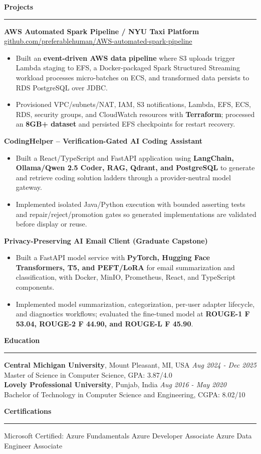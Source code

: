 \documentclass[11pt,letterpaper]{article}
\newcommand{\ressection}[1]{\Needspace{6\baselineskip}\vspace{8pt}\par\textbf{#1}\par\vspace{2pt}\hrule\vspace{5pt}}
\begin{document}
\ressection{Projects}
\textbf{AWS Automated Spark Pipeline / NYU Taxi Platform} \hfill \href{https://github.com/preferablehuman/AWS-automated-spark-pipeline}{github.com/preferablehuman/AWS-automated-spark-pipeline}
\begin{itemize}
  \item Built an \textbf{event-driven AWS data pipeline} where S3 uploads trigger Lambda staging to EFS, a Docker-packaged Spark Structured Streaming workload processes micro-batches on ECS, and transformed data persists to RDS PostgreSQL over JDBC.
  \item Provisioned VPC/subnets/NAT, IAM, S3 notifications, Lambda, EFS, ECS, RDS, security groups, and CloudWatch resources with \textbf{Terraform}; processed an \textbf{8GB+ dataset} and persisted EFS checkpoints for restart recovery.
\end{itemize}
\vspace{2pt}
\textbf{CodingHelper -- Verification-Gated AI Coding Assistant}
\begin{itemize}
  \item Built a React/TypeScript and FastAPI application using \textbf{LangChain, Ollama/Qwen 2.5 Coder, RAG, Qdrant, and PostgreSQL} to generate and retrieve coding solution ladders through a provider-neutral model gateway.
  \item Implemented isolated Java/Python execution with bounded asserting tests and repair/reject/promotion gates so generated implementations are validated before display or reuse.
\end{itemize}

\vspace{2pt}
\textbf{Privacy-Preserving AI Email Client (Graduate Capstone)}
\begin{itemize}
  \item Built a FastAPI model service with \textbf{PyTorch, Hugging Face Transformers, T5, and PEFT/LoRA} for email summarization and classification, with Docker, MinIO, Prometheus, React, and TypeScript components.
  \item Implemented model summarization, categorization, per-user adapter lifecycle, and diagnostics workflows; evaluated the fine-tuned model at \textbf{ROUGE-1 F 53.04, ROUGE-2 F 44.90, and ROUGE-L F 45.90}.
\end{itemize}

\ressection{Education}
\textbf{Central Michigan University}, Mount Pleasant, MI, USA \hfill \textit{Aug 2024 - Dec 2025}\\
Master of Science in Computer Science, GPA: 3.87/4.0\\
\textbf{Lovely Professional University}, Punjab, India \hfill \textit{Aug 2016 - May 2020}\\
Bachelor of Technology in Computer Science and Engineering, CGPA: 8.02/10

\ressection{Certifications}
Microsoft Certified: Azure Fundamentals \textbar{} Azure Developer Associate \textbar{} Azure Data Engineer Associate
\end{document}
